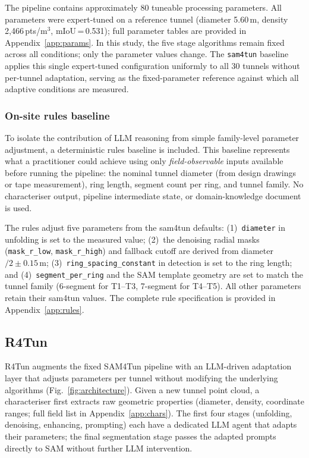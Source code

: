 \documentclass[a4paper,fleqn]{cas-dc}
\begin{document}
The pipeline contains approximately 80 tuneable processing parameters. All parameters were expert-tuned on a reference tunnel (diameter 5.60\,m, density 2{,}466\,pts/m$^3$, mIoU\,=\,0.531); full parameter tables are provided in Appendix~\ref{app:params}. In this study, the five stage algorithms remain fixed across all conditions; only the parameter values change. The \texttt{sam4tun} baseline applies this single expert-tuned configuration uniformly to all 30 tunnels without per-tunnel adaptation, serving as the fixed-parameter reference against which all adaptive conditions are measured.

\subsubsection{On-site rules baseline}\label{sec:rules-baseline}

To isolate the contribution of LLM reasoning from simple family-level parameter adjustment, a deterministic rules baseline is included. This baseline represents what a practitioner could achieve using only \emph{field-observable} inputs available before running the pipeline: the nominal tunnel diameter (from design drawings or tape measurement), ring length, segment count per ring, and tunnel family. No characteriser output, pipeline intermediate state, or domain-knowledge document is used.

The rules adjust five parameters from the sam4tun defaults: (1)~\texttt{diameter} in unfolding is set to the measured value; (2)~the denoising radial masks (\texttt{mask\_r\_low}, \texttt{mask\_r\_high}) and fallback cutoff are derived from diameter$/2 \pm 0.15$\,m; (3)~\texttt{ring\_spacing\_constant} in detection is set to the ring length; and (4)~\texttt{segment\_per\_ring} and the SAM template geometry are set to match the tunnel family (6-segment for T1--T3, 7-segment for T4--T5). All other parameters retain their sam4tun values. The complete rule specification is provided in Appendix~\ref{app:rules}.

\subsection{R4Tun}\label{sec:method}

R4Tun augments the fixed SAM4Tun pipeline with an LLM-driven adaptation layer that adjusts parameters per tunnel without modifying the underlying algorithms (Fig.~\ref{fig:architecture}). Given a new tunnel point cloud, a characteriser first extracts raw geometric properties (diameter, density, coordinate ranges; full field list in Appendix~\ref{app:chars}). The first four stages (unfolding, denoising, enhancing, prompting) each have a dedicated LLM agent that adapts their parameters; the final segmentation stage passes the adapted prompts directly to SAM without further LLM intervention. 
\end{document}
